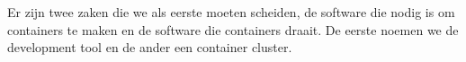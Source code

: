Er zijn twee zaken die we als eerste moeten scheiden, de software die nodig is om containers te maken en de software die containers draait. De eerste noemen we de development tool en de ander een container cluster.
